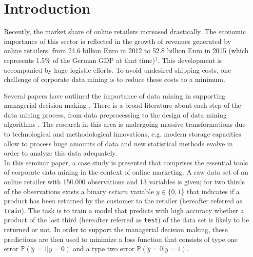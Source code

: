 \documentclass[a4paper,12pt]{article}
\begin{document}
\thispagestyle{empty}


\newpage

\section{Introduction}

Recently, the market share of online retailers increased drastically. The economic importance of this sector is reflected in the growth of revenues generated by online retailers: from 24.6 billion Euro in 2012 to 52.8 billion Euro in 2015 (which represents 1.5\% of the German GDP at that time)$^1$. This development is accompanied by huge logistic efforts. To avoid undesired shipping costs, one challenge of corporate data mining is to reduce these costs to a minimum.

Several papers have outlined the importance of data mining in supporting managerial decision making \cite{manyika2011}. There is a broad literature about each step of the data mining process, from data preprocessing \cite{crone2006} to the design of data mining algorithms \cite{lessmann2015}. The research in this area is undergoing massive transformations due to technological and methodological innovations, e.g. modern storage capacities allow to process huge amounts of data and new statistical methods evolve in order to analyze this data adequately. \\
In this seminar paper, a case study is presented that comprises the essential tools of corporate data mining in the context of online marketing. A raw data set of an online retailer with 150.000 observations and 13 variables is given; for two thirds of the observations exists a binary $return$ variable $y \in \{0,1\}$ that indicates if a product has been returned by the customer to the retailer (hereafter referred as \texttt{train}). The task is to train a model that predicts with high accuracy whether a product of the last third (hereafter referred as \texttt{test}) of the data set is likely to be returned or not. In order to support the managerial decision making, these predictions are then used to minimize a loss function that consists of type one error $\mathbb{P}(\hat{y}=1|y=0)$ and a type two error $\mathbb{P}(\hat{y}=0|y=1)$.  \\
\end{document}
